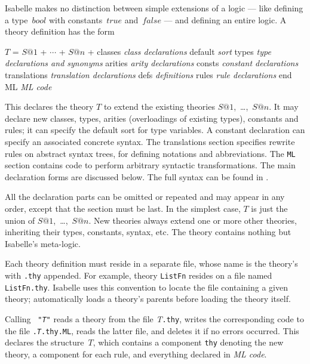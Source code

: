 Isabelle makes no distinction between simple extensions of a logic --- like
defining a type~$bool$ with constants~$true$ and~$false$ --- and defining
an entire logic.  A theory definition has the form
\begin{ttbox}
\(T\) = \(S@1\) + \(\cdots\) + \(S@n\) +
classes      {\it class declarations}
default      {\it sort}
types        {\it type declarations and synonyms}
arities      {\it arity declarations}
consts       {\it constant declarations}
translations {\it translation declarations}
defs         {\it definitions}
rules        {\it rule declarations}
end
ML           {\it ML code}
\end{ttbox}
This declares the theory $T$ to extend the existing theories
$S@1$,~\ldots,~$S@n$.  It may declare new classes, types, arities
(overloadings of existing types), constants and rules; it can specify the
default sort for type variables.  A constant declaration can specify an
associated concrete syntax.  The translations section specifies rewrite
rules on abstract syntax trees, for defining notations and abbreviations.
The {\tt ML} section contains code to perform arbitrary syntactic
transformations.  The main declaration forms are discussed below.
The full syntax can be found in .

All the declaration parts can be omitted or repeated and may appear in any
order, except that the {\ML} section must be last.  In the simplest case, $T$
is just the union of $S@1$,~\ldots,~$S@n$.  New theories always extend one or
more other theories, inheriting their types, constants, syntax, etc.  The
theory  contains nothing but Isabelle's meta-logic.

Each theory definition must reside in a separate file, whose name is the
theory's with {\tt.thy} appended.  For example, theory {\tt ListFn} resides
on a file named {\tt ListFn.thy}.  Isabelle uses this convention to locate the
file containing a given theory;  automatically loads a
theory's parents before loading the theory itself.

Calling ~{\tt"{\it T\/}"} reads a theory from the
file {\it T}{\tt.thy}, writes the corresponding {\ML} code to the file
{\tt.{\it T}.thy.ML}, reads the latter file, and deletes it if no errors
occurred.  This declares the {\ML} structure~$T$, which contains a component
{\tt thy} denoting the new theory, a component for each rule, and everything
declared in {\it ML code}.

